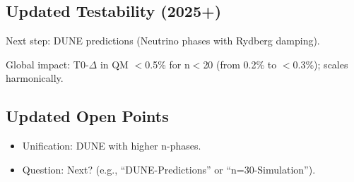 	\subsection{Updated Testability (2025+)}
	
	Next step: DUNE predictions (Neutrino phases with Rydberg damping).
	
	Global impact: T0-$\Delta$ in QM $<$0.5\% for n$<$20 (from 0.2\% to $<$0.3\%); scales harmonically.
	
	\subsection{Updated Open Points}
	
	\begin{itemize}
		\item Unification: DUNE with higher n-phases.
		\item Question: Next? (e.g., ``DUNE-Predictions'' or ``n=30-Simulation'').
	\end{itemize}
